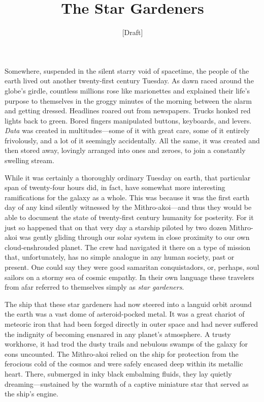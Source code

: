 \documentclass[14pt]{extarticle}
\title{The Star Gardeners}
\author{[Draft]}
\begin{document}
\maketitle

Somewhere,
suspended in the silent starry void of spacetime,
the people of the earth lived out another twenty-first century Tuesday.
As dawn raced around the globe's girdle,
countless millions rose like marionettes
and explained their life's purpose to themselves in the groggy minutes of the morning between the alarm and getting dressed.
Headlines roared out from newspapers.
Trucks honked red lights back to green.
Bored fingers manipulated buttons, keyboards, and levers.
\textit{Data} was created in multitudes---some of it with great care,
some of it entirely frivolously,
and a lot of it seemingly accidentally.
All the same, it was created and then stored away,
lovingly arranged into ones and zeroes, to join a constantly swelling stream.

While it was certainly a thoroughly ordinary Tuesday on earth,
that particular span of twenty-four hours did, in fact, have somewhat more interesting ramifications for the galaxy as a whole.
This was because it was the first earth day of any kind silently witnessed by the Mithro-akoi---and thus they would be able to document the state of twenty-first century humanity for posterity.
For it just so happened that on that very day a starship piloted by two dozen Mithro-akoi was gently gliding through our solar system in close proximity to our own cloud-enshrouded planet.
The crew had navigated it there on a type of mission that, unfortunately, has no simple analogue in any human society, past or present.
One could say they were good samaritan conquistadors,
or, perhaps, soul sailors on a stormy sea of cosmic empathy.
In their own language these travelers from afar referred to themselves simply as \textit{star gardeners}.

The ship that these star gardeners had now steered into a languid orbit around the earth was a vast dome of asteroid-pocked metal.
It was a great chariot of meteoric iron that had been forged directly in outer space 
and had never suffered the indignity of becoming ensnared in any planet's atmosphere.
A trusty workhorse,
it had trod the dusty trails and nebulous swamps of the galaxy for eons uncounted.
The Mithro-akoi relied on the ship for protection from the ferocious cold of the cosmos and were safely encased deep within its metallic heart.
There,
submerged in inky black embalming fluids, they lay quietly dreaming---sustained by the warmth of a captive miniature star that served as the ship's engine.
\end{document}
